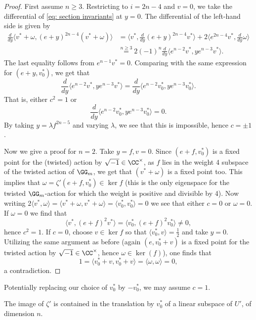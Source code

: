 \documentclass[11pt]{article}
\begin{document}
\begin{proof}
    First assume $n\geq 3$.
    Restricting to $i=2n-4$ and $v=0$, we take the differential of \eqref{eq: section invariants} at $y=0$. The differential of the left-hand side is given by
    \[
    \begin{aligned}
    \frac{d}{dy}\langle v^*+\omega, (e+y)^{2n-4} (v^*+\omega)\rangle &= \langle v^*, \frac{d}{dy}(e+y)^{2n-4} v^*\rangle + 2\langle e^{2n-4}v^*, \frac{d}{dy}\omega\rangle
    \\&\stackrel{n \geq 3}{=} 2(-1)^n\frac{d}{dy}\langle e^{n-2}v^*, y e^{n-3}v^*\rangle.
    \end{aligned}
    \]
    The last equality follows from $e^{n-1}v^*=0$.
    Comparing with the same expression for $(e+y, v_0^*)$, we get that
    $$\frac{d}{dy}\langle e^{n-2}v^*, y e^{n-3}v^*\rangle = \frac{d}{dy}\langle e^{n-2}v_0^*, y e^{n-3}v_0^*\rangle.$$
    That is, either $c^2=1$ or
    $$\frac{d}{dy}\langle e^{n-2}v_0^*, y e^{n-3}v_0^*\rangle = 0.$$
    By taking $y=\lambda f^{2n-5}$ and varying $\lambda$, we see that this is impossible, hence $c=\pm 1$.

    Now we give a proof for $n=2$.
    Take $y=f, v=0$. Since $(e+f,v_0^*)$ is a fixed point for the (twisted) action by $\sqrt{-1}\in \CC^\times$, as $f$ lies in the weight 4 subspace of the twisted action of $\GG_m$, we get that $(v^* + \omega)$ is a fixed point too. This implies that $\omega=\zeta'(e+f, v_0^*)\in \ker f$ (this is the only eigenspace for the twisted $\GG_m$-action for which the weight is positive and divisible by 4).
    Now writing
    $2\langle v^*, \omega \rangle = \langle v^* + \omega, v^* + \omega\rangle = \langle v_0^*, v_0^*\rangle = 0$
    we see that either $c=0$ or $\omega=0$. If $\omega=0$ we find that 
    $$\langle v^*, (e+f)^2v^*\rangle = \langle v_0^*, (e+f)^2v_0^*\rangle\neq 0,$$
    hence $c^2=1$.
    If $c=0$, choose $v\in \ker f$ so that $\langle v_0^*, v\rangle = \frac{1}{2}$ and take $y=0$.
    Utilizing the same argument as before (again $(e,v_0^*+v)$ is a fixed point for the twisted action by $\sqrt{-1}\in \CC^\times$, hence $\omega\in \ker(f)$), one finds that
    $$1 = \langle v_0^* + v, v_0^* + v\rangle = \langle \omega, \omega\rangle = 0,$$
    a contradiction.
\end{proof}
Potentially replacing our choice of $v_0^*$ by $-v_0^*$, we may assume $c=1$.
\begin{lemma}
    The image of $\zeta'$ is contained in the translation by $v_0^*$ of a linear subspace of $U'$, of dimension $n$.
\end{lemma}
\end{document}
